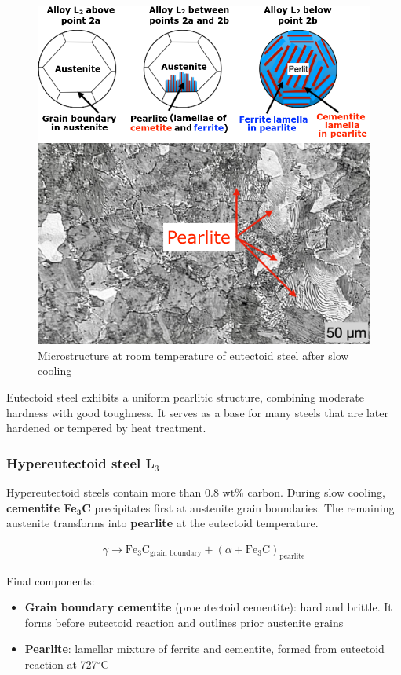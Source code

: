 \documentclass{article}
\begin{document}
\begin{figure}[ht!]
  \centering
  \includegraphics[width=.7\textwidth]{media/eutectic_microstructure.png}
  \caption*{Microstructure at room temperature of eutectoid steel after slow cooling}
\end{figure}

Eutectoid steel exhibits a uniform pearlitic structure, combining moderate hardness
with good toughness. It serves as a base for many steels that are later
hardened or tempered by heat treatment.

\subsubsection{Hypereutectoid steel L$_3$}
Hypereutectoid steels contain more than 0.8 wt\% carbon. During slow cooling,
\textbf{cementite Fe$_\mathbf{3}$C} precipitates first at austenite grain boundaries.
The remaining austenite transforms into \textbf{pearlite} at the eutectoid temperature.

\begin{gather*}
  \gamma \to \mathrm{Fe}_3\mathrm{C}_\text{grain boundary} + (\alpha + \mathrm{Fe}_3\mathrm{C})_\text{pearlite}
\end{gather*}

Final components:
\begin{itemize}
  \item \textbf{Grain boundary cementite} (proeutectoid cementite): hard and brittle. It forms before eutectoid reaction and outlines prior austenite grains
  \item \textbf{Pearlite}: lamellar mixture of ferrite and cementite, formed from eutectoid reaction at 727$^\circ$C
\end{itemize}
\end{document}
